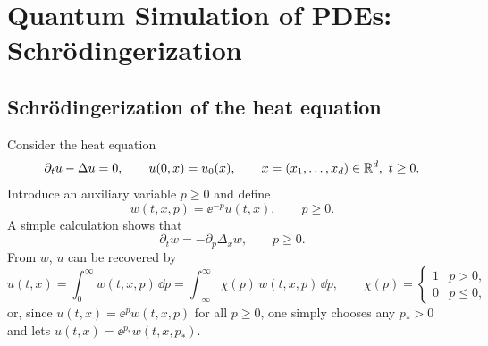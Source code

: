 \chapter{Quantum Simulation of PDEs: Schr\"odingerization}\label{ch:sec05}

\section{Schr\"odingerization of the heat equation}\label{sec:sec05-schrod}

Consider the heat equation
\begin{equation}
  \partial_t u - \Delta u = 0, \qquad u(0, x) = u_0(x),
  \qquad x = (x_1, \dots, x_d) \in \mathbb{R}^d,\ t \ge 0.
\end{equation}
Introduce an auxiliary variable $p \ge 0$ and define
\begin{equation}
  w(t, x, p) = \ee^{-p} u(t, x), \qquad p \ge 0.
  \label{eq:sec05-warp}
\end{equation}
A simple calculation shows that
\begin{equation}
  \partial_t w = -\partial_p \Delta_x w, \qquad p \ge 0.
\end{equation}
From $w$, $u$ can be recovered by
\begin{equation}
  u(t, x) = \int_0^\infty w(t, x, p)\,\dd p = \int_{-\infty}^\infty \chi(p)\, w(t, x, p)\,\dd p,
  \qquad \chi(p) = \begin{cases} 1 & p > 0, \\ 0 & p \le 0, \end{cases}
\end{equation}
or, since $u(t, x) = \ee^{p} w(t, x, p)$ for all $p \ge 0$, one simply chooses any
$p_* > 0$ and lets $u(t, x) = \ee^{p_*} w(t, x, p_*)$.

